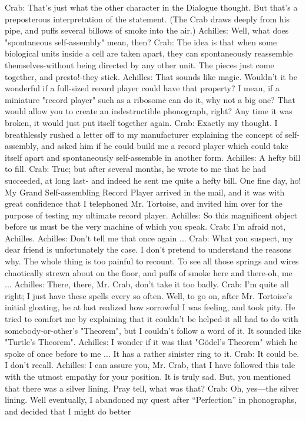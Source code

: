{Crab: That's just what the other character in the Dialogue thought. But that's a
  preposterous interpretation of the statement. (The Crab draws deeply from his pipe,
  and puffs several billows of smoke into the air.)
Achilles: Well, what does "spontaneous self-assembly" mean, then?
Crab: The idea is that when some biological units inside a cell are taken apart, they can
  spontaneously reassemble themselves-without being directed by any other unit. The
  pieces just come together, and presto!-they stick.
Achilles: That sounds like magic. Wouldn't it be wonderful if a full-sized record player
  could have that property? I mean, if a miniature "record player" such as a ribosome
  can do it, why not a big one? That would allow you to create an indestructible
  phonograph, right? Any time it was broken, it would just put itself together again.
Crab: Exactly my thought. I breathlessly rushed a letter off to my manufacturer
  explaining the concept of self-assembly, and asked him if he could build me a record
  player which could take itself apart and spontaneously self-assemble in another form.
Achilles: A hefty bill to fill.
Crab: True; but after several months, he wrote to me that he had succeeded, at long last-
  and indeed he sent me quite a hefty bill. One fine day, ho! My Grand Self-assembling
  Record Player arrived in the mail, and it was with great confidence that I telephoned
  Mr. Tortoise, and invited him over for the purpose of testing my ultimate record
  player.
Achilles: So this magnificent object before us must be the very machine of which you
  speak.
Crab: I'm afraid not, Achilles.
Achilles: Don't tell me that once again ...
Crab: What you suspect, my dear friend is unfortunately the case. I don't pretend to
  understand the reasons why. The whole thing is too painful to recount. To see all those
  springs and wires chaotically strewn about on the floor, and puffs of smoke here and
  there-oh, me ...
Achilles: There, there, Mr. Crab, don't take it too badly.
Crab: I'm quite all right; I just have these spells every so often. Well, to go on, after Mr.
  Tortoise's initial gloating, he at last realized how sorrowful I was feeling, and took
  pity. He tried to comfort me by explaining that it couldn't be helped-it all had to do
  with somebody-or-other's "Theorem", but I couldn't follow a word of it. It sounded
  like "Turtle's Theorem".
Achilles: I wonder if it was that "Gödel’s Theorem" which he spoke of once before to me
  ... It has a rather sinister ring to it. Crab: It could be. I don't recall.
Achilles: I can assure you, Mr. Crab, that I have followed this tale with the utmost
  empathy for your position. It is truly sad. But, you mentioned that there was a silver
  lining. Pray tell, what was that?
Crab: Oh, yes—the silver lining. Well eventually, I abandoned my quest after
  “Perfection” in phonographs, and decided that I might do better




}
